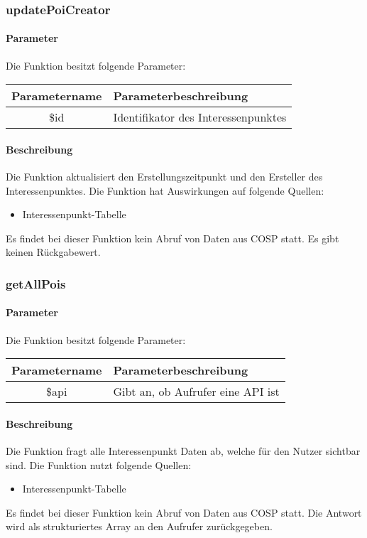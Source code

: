 \subsubsection{updatePoiCreator}
\paragraph{Parameter} Die Funktion besitzt folgende Parameter:
\begin{table}[H]
	\begin{tabular}{|c|p{11cm}|}
		\hline
		\textbf{Parametername} & \textbf{Parameterbeschreibung} \\ \hline
		\$id & Identifikator des Interessenpunktes \\ \hline
	\end{tabular}
\end{table}
\paragraph{Beschreibung} Die Funktion aktualisiert den Erstellungszeitpunkt und den Ersteller des Interessenpunktes. Die Funktion hat Auswirkungen auf folgende Quellen:
\begin{itemize}
	\item Interessenpunkt-Tabelle
\end{itemize}
Es findet bei dieser Funktion kein Abruf von Daten aus {\glqq COSP\grqq} statt. Es gibt keinen Rückgabewert.
\subsubsection{getAllPois}
\paragraph{Parameter} Die Funktion besitzt folgende Parameter:
\begin{table}[H]
	\begin{tabular}{|c|p{11cm}|}
		\hline
		\textbf{Parametername} & \textbf{Parameterbeschreibung} \\ \hline
		\$api & Gibt an, ob Aufrufer eine API ist \\ \hline
	\end{tabular}
\end{table}
\paragraph{Beschreibung} Die Funktion fragt alle Interessenpunkt Daten ab, welche für den Nutzer sichtbar sind. Die Funktion nutzt folgende Quellen:
\begin{itemize}
	\item Interessenpunkt-Tabelle
\end{itemize}
Es findet bei dieser Funktion kein Abruf von Daten aus {\glqq COSP\grqq} statt. Die Antwort wird als strukturiertes Array an den Aufrufer zurückgegeben.
